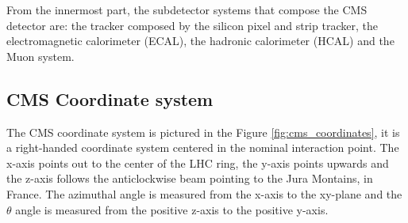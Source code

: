 From the innermost part, the subdetector systems that compose the CMS detector are: the tracker composed by the silicon pixel and strip tracker, the electromagnetic calorimeter (ECAL), the hadronic calorimeter (HCAL) and the Muon system.

\subsection{CMS Coordinate system}

The CMS coordinate system is pictured in the Figure \ref{fig:cms_coordinates}, it is a right-handed coordinate system centered in the nominal interaction point. The x-axis points out to the center of the LHC ring, the y-axis points upwards and the z-axis follows the anticlockwise beam pointing to the Jura Montains, in France. The azimuthal angle is measured from the x-axis to the xy-plane and the $\theta$ angle is measured from the positive z-axis to the positive y-axis.


